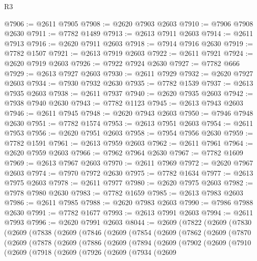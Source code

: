 \begin{lexlean}{R3}
\begin{coremodule}
@7906 := @2611 @7905
@7908 := @2620 @7903 @2603
@7910 := @7906 @7908 @2630
@7911 := @7782 @1489
@7913 := @2613 @7911 @2603
@7914 := @2611 @7913
@7916 := @2620 @7911 @2603
@7918 := @7914 @7916 @2630
@7919 := @7782 @1507
@7921 := @2613 @7919 @2603
@7922 := @2611 @7921
@7924 := @2620 @7919 @2603
@7926 := @7922 @7924 @2630
@7927 := @7782 @666
@7929 := @2613 @7927 @2603
@7930 := @2611 @7929
@7932 := @2620 @7927 @2603
@7934 := @7930 @7932 @2630
@7935 := @7782 @1539
@7937 := @2613 @7935 @2603
@7938 := @2611 @7937
@7940 := @2620 @7935 @2603
@7942 := @7938 @7940 @2630
@7943 := @7782 @1123
@7945 := @2613 @7943 @2603
@7946 := @2611 @7945
@7948 := @2620 @7943 @2603
@7950 := @7946 @7948 @2630
@7951 := @7782 @1574
@7953 := @2613 @7951 @2603
@7954 := @2611 @7953
@7956 := @2620 @7951 @2603
@7958 := @7954 @7956 @2630
@7959 := @7782 @1591
@7961 := @2613 @7959 @2603
@7962 := @2611 @7961
@7964 := @2620 @7959 @2603
@7966 := @7962 @7964 @2630
@7967 := @7782 @1609
@7969 := @2613 @7967 @2603
@7970 := @2611 @7969
@7972 := @2620 @7967 @2603
@7974 := @7970 @7972 @2630
@7975 := @7782 @1634
@7977 := @2613 @7975 @2603
@7978 := @2611 @7977
@7980 := @2620 @7975 @2603
@7982 := @7978 @7980 @2630
@7983 := @7782 @1659
@7985 := @2613 @7983 @2603
@7986 := @2611 @7985
@7988 := @2620 @7983 @2603
@7990 := @7986 @7988 @2630
@7991 := @7782 @1677
@7993 := @2613 @7991 @2603
@7994 := @2611 @7993
@7996 := @2620 @7991 @2603
@8044 := @2609
    (@7822
      (@2609
        (@7830
          (@2609
            (@7838
              (@2609
                (@7846
                  (@2609
                    (@7854
                      (@2609
                        (@7862
                          (@2609
                            (@7870
                              (@2609
                                (@7878
                                  (@2609
                                    (@7886
                                      (@2609
                                        (@7894
                                          (@2609
                                            (@7902
                                              (@2609
                                                (@7910
                                                  (@2609
                                                    (@7918
                                                      (@2609
                                                        (@7926
                                                          (@2609
                                                            (@7934
                                                              (@2609

\end{coremodule}
\end{lexlean}
